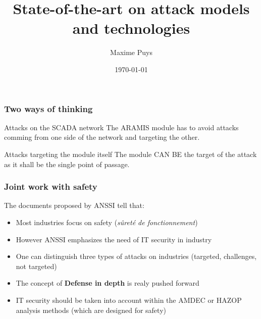 \documentclass{beamer}
\title[Sota on attack models and technologies]{State-of-the-art on attack models and technologies}
\author{Maxime Puys}
\date{\today}
\begin{document}
\begin{frame}
    \maketitle
\end{frame}

%

\begin{frame}
    \frametitle{Two ways of thinking}

    \begin{block}{Attacks on the SCADA network}
        The ARAMIS module has to avoid attacks comming from one side of the network and targeting the other.
    \end{block}
    \vfill
    \begin{block}{Attacks targeting the module itself}
        The module CAN BE the target of the attack as it shall be the single point of passage.
    \end{block}
\end{frame}

\begin{frame}
    \frametitle{Joint work with safety}

    The documents proposed by ANSSI tell that:
    \vfill
    \begin{itemize}
        \item Most industries focus on safety ({\em s\^uret\'e de fonctionnement})
            \vfill
        \item However ANSSI emphasizes the need of IT security in industry
            \vfill
        \item One can distinguish three types of attacks on industries (targeted, challenges, not targeted)
            \vfill
        \item The concept of {\bf Defense in depth} is realy pushed forward
            \vfill
        \item IT security should be taken into account within the AMDEC or HAZOP analysis methods (which are designed for safety)
    \end{itemize}
\end{frame}
\end{document}
